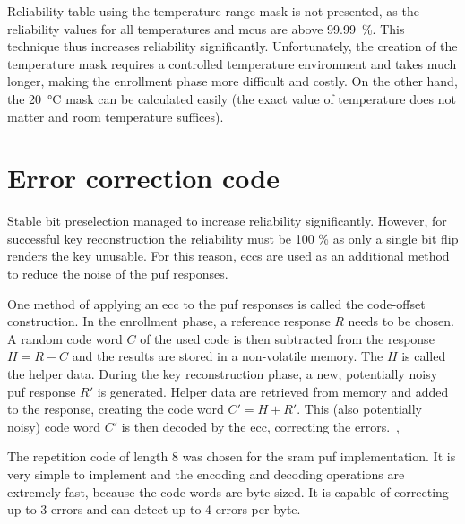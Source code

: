 Reliability table using the temperature range mask is not presented, as the reliability values for all temperatures and \glspl{mcu} are above 99.99~\%. This technique thus increases reliability significantly. Unfortunately, the creation of the temperature mask requires a controlled temperature environment and takes much longer, making the enrollment phase more difficult and costly. On the other hand, the 20~°C mask can be calculated easily (the exact value of temperature does not matter and room temperature suffices).


\section{Error correction code}\label{sec:ecc}

Stable bit preselection managed to increase reliability significantly. However, for successful key reconstruction the reliability must be 100 \% as only a single bit flip renders the key unusable. For this reason, \glspl{ecc} are used as an additional method to reduce the noise of the \gls{puf} responses.

One method of applying an \gls{ecc} to the \gls{puf} responses is called the code-offset construction. In the enrollment phase, a reference response $R$ needs to be chosen. A random code word $C$ of the used code is then subtracted from the response $H = R - C$ and the results are stored in a non-volatile memory. The $H$ is called the helper data. During the key reconstruction phase, a new, potentially noisy \gls{puf} response $R'$ is generated. Helper data are retrieved from memory and added to the response, creating the code word $C' = H + R'$. This (also potentially noisy) code word $C'$ is then decoded by the \gls{ecc}, correcting the errors.~\cite{Sven2015},~\cite{Dodis2008}

The repetition code of length 8 was chosen for the \gls{sram} \gls{puf} implementation. It is very simple to implement and the encoding and decoding operations are extremely fast, because the code words are byte-sized. It is capable of correcting up to 3 errors and can detect up to 4 errors per byte.

